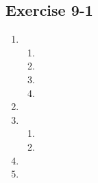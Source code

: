 \subsection{Exercise 9-1} %
\begin{enumerate}[noitemsep, label=\textbf{\arabic*}.]
\item %
\begin{enumerate}[noitemsep, label=\textbf{(\alph*)} ]
 \item %
\item %
\item %
\item %
\end{enumerate}
\item %
\item %
\begin{enumerate}[noitemsep, label=\textbf{(\alph*)} ]
  \item %
  \item %
  \end{enumerate}

\item %

\item %

\end{enumerate}
